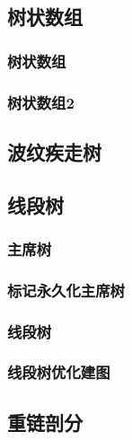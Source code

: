 \documentclass{article}
\begin{document}
\begin{multicols*}{3}
\subsection{树状数组}
\subsubsection{树状数组}


\subsubsection{树状数组2}


\subsection{波纹疾走树}


\subsection{线段树}
\subsubsection{主席树}


\subsubsection{标记永久化主席树}


\subsubsection{线段树}


\subsubsection{线段树优化建图}


\subsection{重链剖分}



\end{multicols*}
\end{document}
